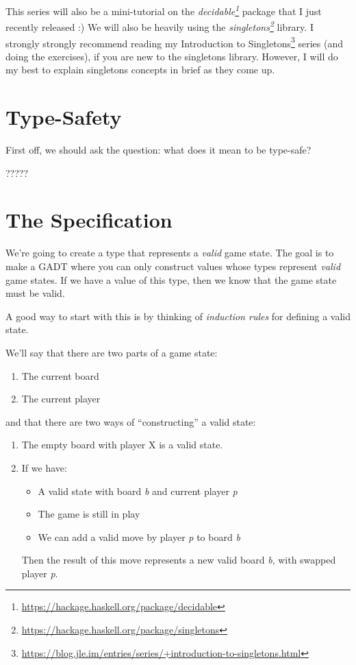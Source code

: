 \documentclass[]{article}
\renewcommand{\href}[2]{#2\footnote{\url{#1}}}
\begin{document}
This series will also be a mini-tutorial on the
\emph{\href{https://hackage.haskell.org/package/decidable}{decidable}} package
that I just recently released :) We will also be heavily using the
\emph{\href{https://hackage.haskell.org/package/singletons}{singletons}}
library. I strongly strongly recommend reading my
\href{https://blog.jle.im/entries/series/+introduction-to-singletons.html}{Introduction
to Singletons} series (and doing the exercises), if you are new to the
singletons library. However, I will do my best to explain singletons concepts in
brief as they come up.

\section{Type-Safety}\label{type-safety}

First off, we should ask the question: what does it mean to be type-safe?

?????

\section{The Specification}\label{the-specification}

We're going to create a type that represents a \emph{valid} game state. The goal
is to make a GADT where you can only construct values whose types represent
\emph{valid} game states. If we have a value of this type, then we know that the
game state must be valid.

A good way to start with this is by thinking of \emph{induction rules} for
defining a valid state.

We'll say that there are two parts of a game state:

\begin{enumerate}
\def\labelenumi{\arabic{enumi}.}
\tightlist
\item
  The current board
\item
  The current player
\end{enumerate}

and that there are two ways of ``constructing'' a valid state:

\begin{enumerate}
\def\labelenumi{\arabic{enumi}.}
\item
  The empty board with player X is a valid state.
\item
  If we have:

  \begin{itemize}
  \tightlist
  \item
    A valid state with board \emph{b} and current player \emph{p}
  \item
    The game is still in play
  \item
    We can add a valid move by player \emph{p} to board \emph{b}
  \end{itemize}

  Then the result of this move represents a new valid board \emph{b}, with
  swapped player \emph{p}.
\end{enumerate}
\end{document}
